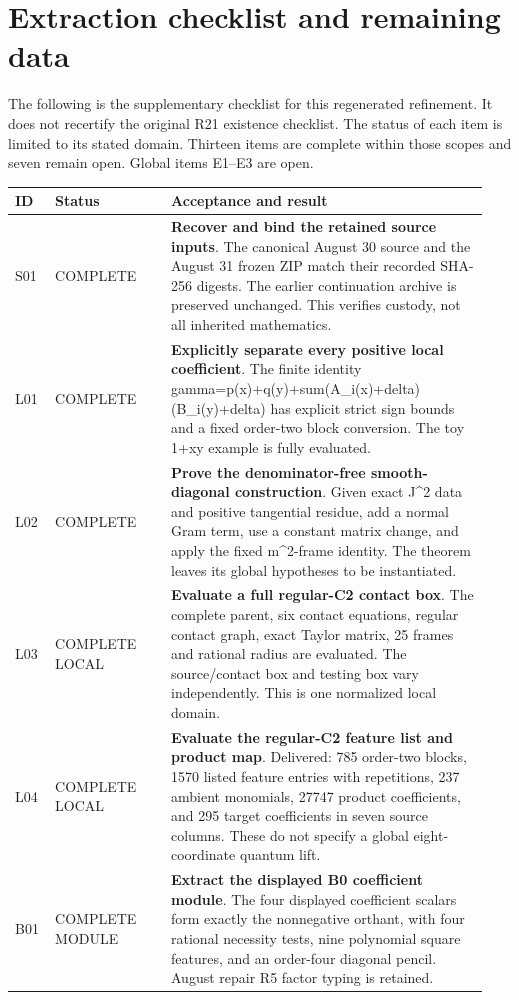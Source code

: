 \section{Extraction checklist and remaining data}
\label{sec:checklist}
The following is the supplementary checklist for this regenerated refinement. It does not recertify the original R21 existence checklist. The status of each item is limited to its stated domain. Thirteen items are complete within those scopes and seven remain open. Global items E1--E3 are open.
\small
\begin{longtable}{@{}>{\raggedright\arraybackslash}p{0.075\linewidth}>{\raggedright\arraybackslash}p{0.235\linewidth}>{\raggedright\arraybackslash}p{0.63\linewidth}@{}}
\toprule ID & Status & Acceptance and result\\\midrule\endhead
S01 & COMPLETE & \textbf{Recover and bind the retained source inputs}. The canonical August 30 source and the August 31 frozen ZIP match their recorded SHA-256 digests. The earlier continuation archive is preserved unchanged. This verifies custody, not all inherited mathematics.\\[5pt]
L01 & COMPLETE & \textbf{Explicitly separate every positive local coefficient}. The finite identity gamma=p(x)+q(y)+sum(A\_i(x)+delta)(B\_i(y)+delta) has explicit strict sign bounds and a fixed order-two block conversion. The toy 1+xy example is fully evaluated.\\[5pt]
L02 & COMPLETE & \textbf{Prove the denominator-free smooth-diagonal construction}. Given exact J\textasciicircum{}2 data and positive tangential residue, add a normal Gram term, use a constant matrix change, and apply the fixed m\textasciicircum{}2-frame identity. The theorem leaves its global hypotheses to be instantiated.\\[5pt]
L03 & COMPLETE LOCAL & \textbf{Evaluate a full regular-C2 contact box}. The complete parent, six contact equations, regular contact graph, exact Taylor matrix, 25 frames and rational radius are evaluated. The source/contact box and testing box vary independently. This is one normalized local domain.\\[5pt]
L04 & COMPLETE LOCAL & \textbf{Evaluate the regular-C2 feature list and product map}. Delivered: 785 order-two blocks, 1570 listed feature entries with repetitions, 237 ambient monomials, 27747 product coefficients, and 295 target coefficients in seven source columns. These do not specify a global eight-coordinate quantum lift.\\[5pt]
B01 & COMPLETE MODULE & \textbf{Extract the displayed B0 coefficient module}. The four displayed coefficient scalars form exactly the nonnegative orthant, with four rational necessity tests, nine polynomial square features, and an order-four diagonal pencil. August repair R5 factor typing is retained.\\[5pt]

\end{longtable}
